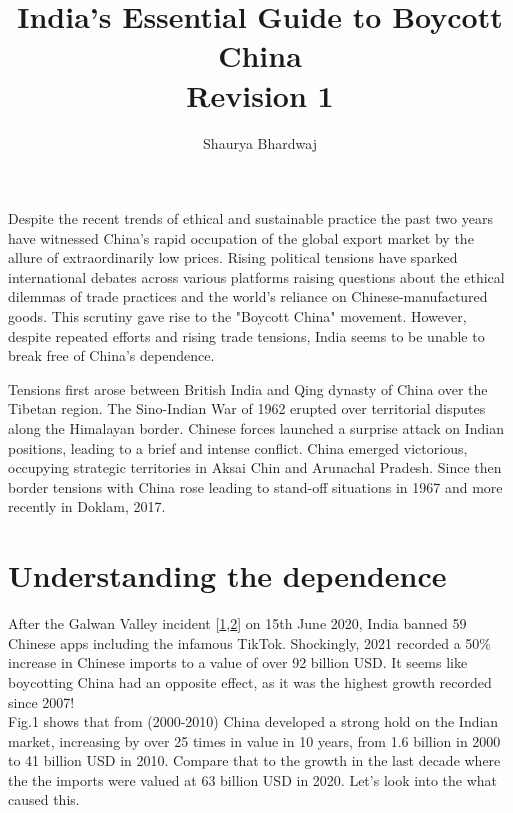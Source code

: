 \documentclass{article}
\title {India's Essential Guide to Boycott China \\[1ex] \large Revision 1}
\author{Shaurya Bhardwaj}
\begin{document}
\maketitle

Despite the recent trends of ethical and sustainable practice the past two years have witnessed China's rapid occupation of the global export market by the allure of extraordinarily low prices. Rising political tensions have sparked international debates across various platforms raising questions about the ethical dilemmas of trade practices and the world's reliance on Chinese-manufactured goods. This scrutiny gave rise to the "Boycott China" movement. However, despite repeated efforts and rising trade tensions, India seems to be unable to break free of China's dependence.

\bigskip

Tensions first arose between British India and Qing dynasty of China over the Tibetan region.
The Sino-Indian War of 1962 erupted over territorial disputes along the Himalayan border. Chinese forces launched a surprise attack on Indian positions, leading to a brief and intense conflict. China emerged victorious, occupying strategic territories in Aksai Chin and Arunachal Pradesh. 
Since then border tensions with China rose leading to stand-off situations in 1967 and more recently in Doklam, 2017.

\bigskip

\section*{Understanding the dependence}

After the Galwan Valley incident [\hyperlink{link1}{1},\hyperlink{link2}{2}] on 15th June 2020, India banned 59 Chinese apps including the infamous TikTok. Shockingly, 2021 recorded a 50\% increase in Chinese imports to a value of over 92 billion USD. It seems like boycotting China had an opposite effect, as it was the highest growth recorded since 2007! 
\bigskip
\\
Fig.1 shows that from (2000-2010) China developed a strong hold on the Indian market, increasing by over 25 times in value in 10 years, from 1.6 billion in 2000 to 41 billion USD in 2010. Compare that to the growth in the last decade where the the imports were valued at 63 billion USD in 2020. Let’s look into the what caused this.
\end{document}
